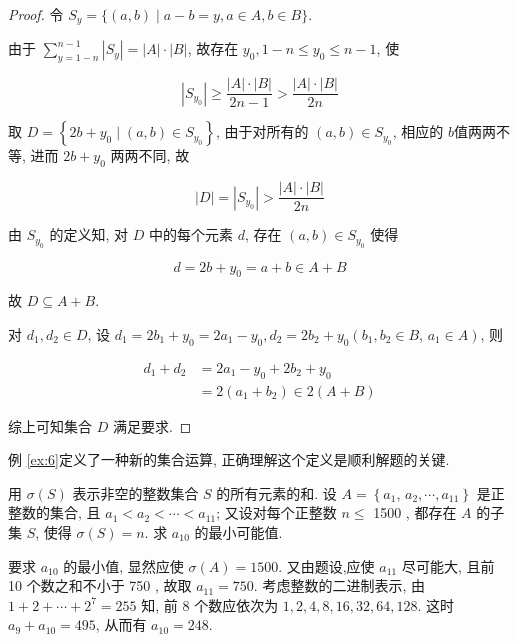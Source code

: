 \begin{proof}
	令 $S_{y}=\{(a, b) \mid a-b=y, a \in A, b \in B\}$.

	由于 $\sum_{y=1-n}^{n-1}\left|S_{y}\right|=|A| \cdot|B|$, 故存在 $y_{0}, 1-n \leqslant y_{0} \leqslant n-1$, 使

	$$
		\left|S_{y_{0}}\right| \geqslant \frac{|A| \cdot|B|}{2 n-1}>\frac{|A| \cdot|B|}{2 n}
	$$

	取 $D=\left\{2 b+y_{0} \mid(a, b) \in S_{y_{0}}\right\}$, 由于对所有的 $(a, b) \in S_{y_{0}}$, 相应的 $b$值两两不等, 进而 $2 b+y_{0}$ 两两不同, 故

	$$
		|D|=\left|S_{y_{0}}\right|>\frac{|A| \cdot|B|}{2 n}
	$$

	由 $S_{y_{0}}$ 的定义知, 对 $D$ 中的每个元素 $d$, 存在 $(a, b) \in S_{y_{0}}$ 使得

	$$
		d=2 b+y_{0}=a+b \in A+B
	$$

	故 $D \subseteq A+B$.

	对 $d_{1}, d_{2} \in D$, 设 $d_{1}=2 b_{1}+y_{0}=2 a_{1}-y_{0}, d_{2}=2 b_{2}+y_{0}\left(b_{1}, b_{2} \in B\right.$, $\left.a_{1} \in A\right)$, 则

	$$
		\begin{aligned}
			d_{1}+d_{2} & =2 a_{1}-y_{0}+2 b_{2}+y_{0}          \\
			            & =2\left(a_{1}+b_{2}\right) \in 2(A+B)
		\end{aligned}
	$$

	综上可知集合 $D$ 满足要求.
\end{proof}

\begin{note}
	例 \ref{ex:6}定义了一种新的集合运算, 正确理解这个定义是顺利解题的关键.
\end{note}

\begin{example}
	用 $\sigma(S)$ 表示非空的整数集合 $S$ 的所有元素的和. 设 $A=\left\{a_{1}\right.$, $\left.a_{2}, \cdots, a_{11}\right\}$ 是正整数的集合, 且 $a_{1}<a_{2}<\cdots<a_{11}$; 又设对每个正整数 $n \leqslant$ 1500 , 都存在 $A$ 的子集 $S$, 使得 $\sigma(S)=n$. 求 $a_{10}$ 的最小可能值.
\end{example}

\begin{analysis}
	要求 $a_{10}$ 的最小值, 显然应使 $\sigma(A)=1500$. 又由题设,应使 $a_{11}$ 尽可能大, 且前 10 个数之和不小于 750 , 故取 $a_{11}=750$. 考虑整数的二进制表示, 由 $1+2+\cdots+2^{7}=255$ 知, 前 8 个数应依次为 $1 ,  2 ,  4 ,  8 ,  16 ,  32 ,  64 ,  128$. 这时 $a_{9}+a_{10}=495$, 从而有 $a_{10}=248$.
\end{analysis}

